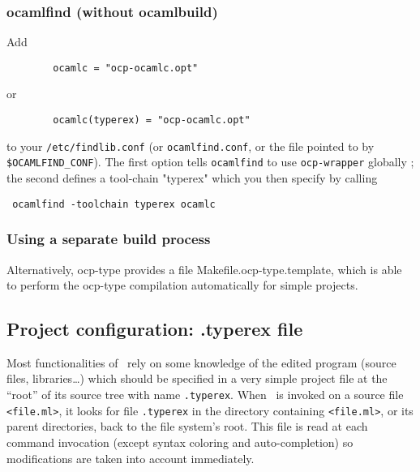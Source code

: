 \subsubsection{ocamlfind (without ocamlbuild)}
Add
{\verbsize \begin{verbatim}
        ocamlc = "ocp-ocamlc.opt"
\end{verbatim}}
\noindent or
{\verbsize \begin{verbatim}
        ocamlc(typerex) = "ocp-ocamlc.opt"
\end{verbatim}}
\noindent to your \verb!/etc/findlib.conf! (or \verb!ocamlfind.conf!,
or the file pointed to by \verb!$OCAMLFIND_CONF!).  The first
option tells \verb!ocamlfind! to use \verb!ocp-wrapper! globally ; the
second defines a tool-chain "typerex" which you then specify by calling
{\verbsize \begin{verbatim} ocamlfind -toolchain typerex ocamlc
\end{verbatim}}

\subsubsection{Using a separate build process}
Alternatively, ocp-type provides a file Makefile.ocp-type.template,
which is able to perform the ocp-type compilation automatically for
simple projects.

\subsection{Project configuration: .typerex file}

Most functionalities of \typerex\ rely on some knowledge of the edited
program (source files, libraries\ldots) which should be specified in a
very simple project file at the ``root'' of its source tree with name
\verb!.typerex!.
%
When \typerex\ is invoked on a source file \verb!<file.ml>!, it looks
for file \verb!.typerex! in the directory containing \verb!<file.ml>!,
or its parent directories, back to the file system's root. This file
is read at each command invocation (except syntax coloring and
auto-completion) so modifications are taken into account immediately.

